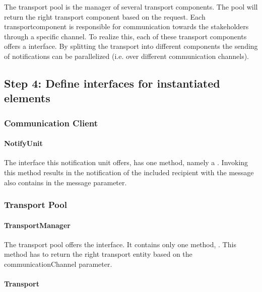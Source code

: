 \npar The transport pool is the manager of several transport components. The
pool will return the right transport component based on the request. Each
transportcomponent is responsible for communication towards the stakeholders
through a specific channel. To realize this, each of these transport components
offers a  interface. By splitting the transport into different
components the sending of notifications can be parallelized (i.e. over
different communication channels).

\subsection{Step 4: Define interfaces for instantiated elements}
\label{add:it7/interfaces}

\subsubsection{Communication Client}

\paragraph{NotifyUnit}
\npar The interface this notification unit offers, has one method, namely a
. Invoking this method results in the notification of
the included recipient with the message also contains in the message parameter.

\subsubsection{Transport Pool}

\paragraph{TransportManager}

\npar The transport pool offers the  interface. It
contains only one method, . This method has to return the right transport entity based on the
communicationChannel parameter.

\paragraph{Transport}

